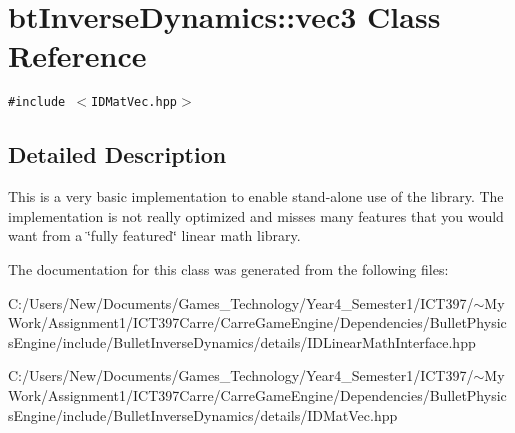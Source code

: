 \hypertarget{classbt_inverse_dynamics_1_1vec3}{
\section{btInverseDynamics::vec3 Class Reference}
\label{classbt_inverse_dynamics_1_1vec3}
}
{\tt \#include $<$IDMatVec.hpp$>$}



\subsection{Detailed Description}
This is a very basic implementation to enable stand-alone use of the library. The implementation is not really optimized and misses many features that you would want from a \char`\"{}fully featured\char`\"{} linear math library. 

The documentation for this class was generated from the following files:\begin{CompactItemize}
\item 
C:/Users/New/Documents/Games\_\-Technology/Year4\_\-Semester1/ICT397/$\sim$My Work/Assignment1/ICT397Carre/CarreGameEngine/Dependencies/BulletPhysicsEngine/include/BulletInverseDynamics/details/IDLinearMathInterface.hpp\item 
C:/Users/New/Documents/Games\_\-Technology/Year4\_\-Semester1/ICT397/$\sim$My Work/Assignment1/ICT397Carre/CarreGameEngine/Dependencies/BulletPhysicsEngine/include/BulletInverseDynamics/details/IDMatVec.hpp\end{CompactItemize}
